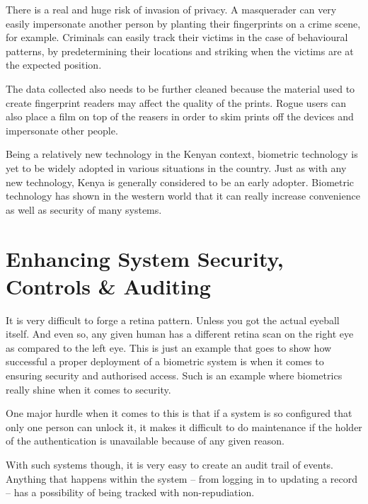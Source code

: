\documentclass[12pt]{report}
\begin{document}
There is a real and huge risk of invasion of privacy. A masquerader can very easily impersonate another person by planting their fingerprints on a crime scene, for example. Criminals can easily track their victims in the case of behavioural patterns, by predetermining their locations and striking when the victims are at the expected position.


The data collected also needs to be further cleaned because the material used to create fingerprint readers may affect the quality of the prints. Rogue users can also place a film on top of the reasers in order to skim prints off the devices and impersonate other people.


Being a relatively new technology in the Kenyan context, biometric technology is yet to be widely adopted in various situations in the country. Just as with any new technology, Kenya is generally considered to be an early adopter. Biometric technology has shown in the western world that it can really increase convenience as well as security of many systems. 

\chapter{Enhancing System Security, Controls \& Auditing}

It is very difficult to forge a retina pattern. Unless you got the actual eyeball itself. And even so, any given human has a different retina scan on the right eye as compared to the left eye. This is just an example that goes to show how successful a proper deployment of a biometric system is when it comes to ensuring security and authorised access. Such is an example where biometrics really shine when it comes to security.

One major hurdle when it comes to this is that if a system is so configured that only one person can unlock it, it makes it difficult to do maintenance if the holder of the authentication is unavailable because of any given reason.

With such systems though, it is very easy to create an audit trail of events. Anything that happens within the system -- from logging in to updating a record -- has a possibility of being tracked with non-repudiation. 
\end{document}
